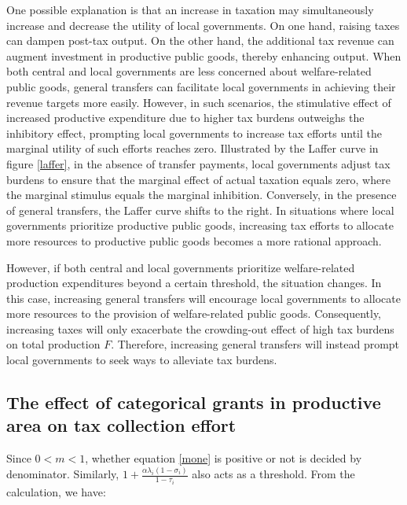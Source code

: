 One possible explanation is that an increase in taxation may simultaneously increase and decrease the utility of local governments. On one hand, raising taxes can dampen post-tax output. On the other hand, the additional tax revenue can augment investment in productive public goods, thereby enhancing output. When both central and local governments are less concerned about welfare-related public goods, general transfers can facilitate local governments in achieving their revenue targets more easily. However, in such scenarios, the stimulative effect of increased productive expenditure due to higher tax burdens outweighs the inhibitory effect, prompting local governments to increase tax efforts until the marginal utility of such efforts reaches zero. Illustrated by the Laffer curve in figure \ref{laffer}, in the absence of transfer payments, local governments adjust tax burdens to ensure that the marginal effect of actual taxation equals zero, where the marginal stimulus equals the marginal inhibition. Conversely, in the presence of general transfers, the Laffer curve shifts to the right. In situations where local governments prioritize productive public goods, increasing tax efforts to allocate more resources to productive public goods becomes a more rational approach.

However, if both central and local governments prioritize welfare-related production expenditures beyond a certain threshold, the situation changes. In this case, increasing general transfers will encourage local governments to allocate more resources to the provision of welfare-related public goods. Consequently, increasing taxes will only exacerbate the crowding-out effect of high tax burdens on total production $F$. Therefore, increasing general transfers will instead prompt local governments to seek ways to alleviate tax burdens.

\subsection{The effect of categorical grants in productive area on tax collection effort}

Since $0<m<1$, whether equation \ref{mone} is positive or not is decided by denominator. Similarly, $1+\frac{\alpha \lambda_i(1-\sigma_i)}{1-\tau_i}$ also acts as a threshold. From the calculation, we have:

